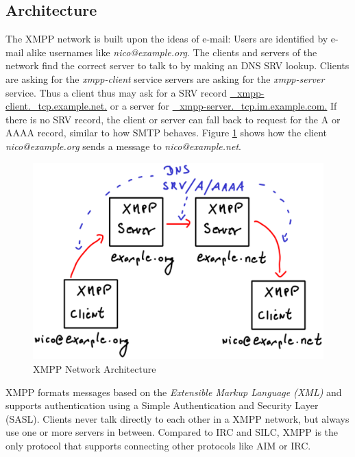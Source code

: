 \subsection{Architecture}
The XMPP network is built upon the ideas of e-mail: Users are identified
by e-mail alike usernames like \textit{nico@example.org}. The clients and
servers of the network find the correct server to talk to by making an
DNS SRV\cite{rfc2782} lookup. 
Clients are asking for the \textit{xmpp-client} service
servers are asking for the \textit{xmpp-server} service.
Thus a client thus may ask for a SRV record
\url{_xmpp-client._tcp.example.net.} or a server for
\url{_xmpp-server._tcp.im.example.com.}
If there is no SRV record, the client or server can fall back
to request for the A or AAAA record, similar to how 
SMTP\cite{rfc2821} behaves. Figure \ref{jabberarch} shows
how the client \textit{nico@example.org} sends a message
to \textit{nico@example.net}.
\begin{figure}
    \centering
    \caption{XMPP Network Architecture}
    \label{jabberarch}
    \includegraphics[scale=0.8]{jabberarch.eps}
\end{figure}
XMPP formats messages based on the 
\textit{Extensible Markup Language (XML)} and
supports authentication using a 
Simple Authentication and Security Layer (SASL)\cite{rfc4422}.
Clients never talk directly to each other in a XMPP network, but
always use one or more servers in between. Compared to IRC and SILC,
XMPP is the only protocol that supports connecting other protocols
like AIM or IRC.
